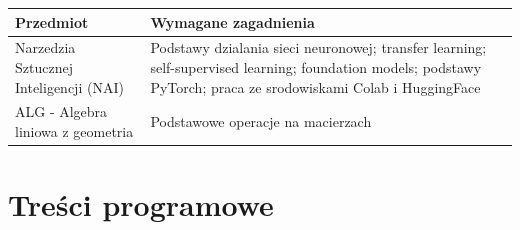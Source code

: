 \documentclass[12pt, a4paper]{article}
\newcommand{\thdrule}{\noalign{\global\setlength{\extrarowheight}{0pt}}}
\newcommand{\thdend}{\noalign{\global\setlength{\extrarowheight}{3pt}}}
\begin{document}
{\scriptsize
\begin{tabularx}{\textwidth}{m{5cm}Y}
\thdrule\toprule
{} {\color{white}\textbf{Przedmiot}} & {\color{white}\textbf{Wymagane zagadnienia}} \\
\midrule\thdend
   Narzedzia Sztucznej Inteligencji (NAI) & Podstawy dzialania sieci neuronowej; transfer learning; self-supervised learning; foundation models; podstawy PyTorch; praca ze srodowiskami Colab i HuggingFace \\
   ALG - Algebra liniowa z geometria & Podstawowe operacje na macierzach \\
\bottomrule
\end{tabularx}}

\section{Treści programowe}
\end{document}
